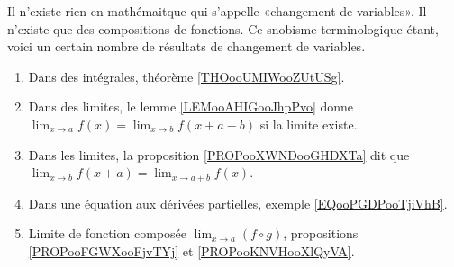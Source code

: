 Il n'existe rien en mathémaitque qui s'appelle «changement de variables». Il n'existe que des compositions de fonctions. Ce snobisme terminologique étant, voici un certain nombre de résultats de changement de variables.
\begin{enumerate}
	\item
	      Dans des intégrales, théorème \ref{THOooUMIWooZUtUSg}.
	\item
	      Dans des limites, le lemme \ref{LEMooAHIGooJhpPvo} donne \( \lim_{x\to a} f(x)=\lim_{x\to b}f(x+a-b)\) si la limite existe.
	\item
	      Dans les limites, la proposition \ref{PROPooXWNDooGHDXTa} dit que \( \lim_{x\to b}f(x+a)=\lim_{x\to a+b}f(x)\).
	\item
	      Dans une équation aux dérivées partielles, exemple \ref{EQooPGDPooTjiVhB}.
	\item
	      Limite de fonction composée \( \lim_{x\to a}(f\circ g) \), propositions \ref{PROPooFGWXooFjvTYj} et \ref{PROPooKNVHooXlQyVA}.
\end{enumerate}
